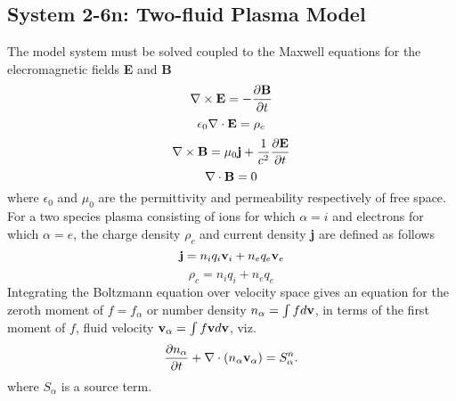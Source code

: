 \subsection{System 2-6n: Two-fluid Plasma Model}\label{sec:2fluid}
The model system must be solved coupled to the Maxwell equations
for the elecromagnetic fields {\bf E} and {\bf B}
\begin{equation}
\label{eq:bdot} 
\nabla \times {\bf E} = - \frac{\partial {\bf B}} {\partial t}
\end{equation}
\begin{equation}
\label{eq:dive} 
\epsilon_0 \nabla \cdot {\bf E} = \rho_c
\end{equation}
\begin{equation}
\label{eq:edot}
\nabla \times {\bf B} = \mu_0 {\bf j} +\frac{1}{c^2} \frac{\partial {\bf E}} {\partial t}
\end{equation}
\begin{equation}
\label{eq:divb}
\nabla\cdot {\bf B} = 0   
\end{equation}
where $\epsilon_0$ and $\mu_0$ are the permittivity and permeability 
respectively of free space. For a two species plasma consisting of ions
for which $\alpha=i$ and electrons for which $\alpha=e$, the charge density $\rho_c$ and 
current density {\bf j} are defined as follows
\begin{equation}
\label{eq:j}
{\bf j} =  n_i q_i {\bf v}_i + n_e q_e {\bf v}_e
\end{equation}
\begin{equation}
\label{eq:rhoc}
\rho_c =  n_i q_i  + n_e q_e 
\end{equation}
Integrating the Boltzmann equation over velocity space gives
an equation for the  zeroth moment of $f = f_\alpha $ or number density $n_\alpha  = \int f d{\bf 
v}$, in terms of the first moment of $f$, fluid velocity ${\bf v}_\alpha  = \int f {\bf v}
d{\bf v}$, viz.
\label{eq:e2.6}
\begin{equation}
\frac{\partial n_\alpha } {\partial t} + \nabla \cdot (n_\alpha {\bf v}_\alpha ) = S^n_\alpha .
\end{equation}
where $S_\alpha $ is a source term.

